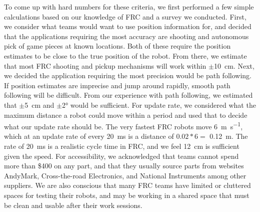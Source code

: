 \documentclass{article}
\begin{document}
  To come up with hard numbers for these criteria, we first performed a few simple calculations based on our knowledge of FRC and a survey we conducted. First, we consider what teams would want to use position information for, and decided that the applications requiring the most accuracy are shooting and autonomous pick of game pieces at known locations. Both of these require the position estimates to be close to the true position of the robot. From there, we estimate that most FRC shooting and pickup mechanisms will work within $\pm$\SI{10}{\centi\meter}. Next, we decided the application requiring the most precision would be path following. If position estimates are imprecise and jump around rapidly, smooth path following will be difficult. From our experience with path following, we estimated that $\pm$\SI{5}{\centi\meter} and  $\pm$\ang{2} would be sufficient. For update rate, we considered what the maximum distance a robot could move within a period and used that to decide what our update rate should be. The very fastest FRC robots move \SI{6}{\meter\per\second}, which at an update rate of every \SI{20}{\milli\second} is a distance of $0.02*6 =$ \SI{0.12}{\meter}. The rate of \SI{20}{\milli\second} is a realistic cycle time in FRC, and we feel \SI{12}{\centi\meter} is sufficient given the speed. For accessibility, we acknowledged that teams cannot spend more than \$400 on any part, and that they usually source parts from websites AndyMark, Cross-the-road Electronics, and National Instruments among other suppliers. We are also conscious that many FRC teams have limited or cluttered spaces for testing their robots, and may be working in a shared space that must be clean and usable after their work sessions.
\end{document}
